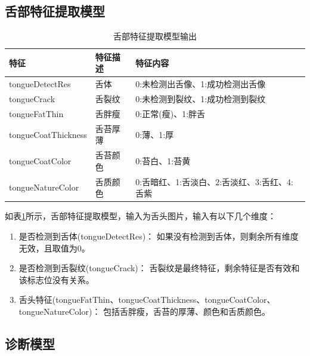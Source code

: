 \subsection{舌部特征提取模型}

\begin{table}[h]
    \centering
    \caption{舌部特征提取模型输出}
    \begin{tabular}{lll}
        \toprule
        特征 & 特征描述 & 特征内容 \\ 
        \midrule
        tongueDetectRes & 舌体 & 0:未检测出舌像、1:成功检测出舌像 \\
        tongueCrack & 舌裂纹 & 0:未检测到裂纹、1:成功检测到裂纹 \\ 
        tongueFatThin & 舌胖瘦 & 0:正常(瘦)、1:胖舌 \\
        tongueCoatThickness & 舌苔厚薄 & 0:薄、1:厚 \\
        tongueCoatColor & 舌苔颜色 & 0:苔白、1:苔黄 \\
        tongueNatureColor & 舌质颜色 & 0:舌暗红、1:舌淡白、2:舌淡红、3:舌红、4:舌紫\\
        \bottomrule
    \end{tabular}
    \label{tab:tongue-feature}
\end{table}

如表\ref{tab:tongue-feature}所示，舌部特征提取模型，输入为舌头图片，输入有以下几个维度：

\begin{enumerate}
    \item 是否检测到舌体(tongueDetectRes)： 如果没有检测到舌体，则剩余所有维度无效，且取值为0。

    \item 是否检测到舌裂纹(tongueCrack)： 舌裂纹是最终特征，剩余特征是否有效和该标志位没有关系。

    \item 舌头特征(tongueFatThin、tongueCoatThickness、tongueCoatColor、tongueNatureColor)： 包括舌胖瘦，舌苔的厚薄、颜色和舌质颜色。

\end{enumerate}

\subsection{诊断模型}

